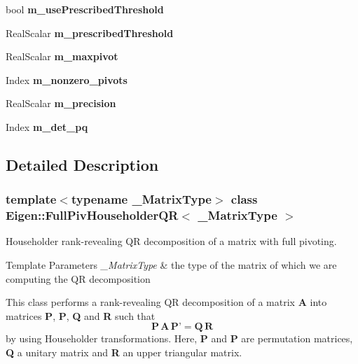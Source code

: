 \begin{DoxyCompactItemize}
bool {\bfseries m\+\_\+use\+Prescribed\+Threshold}
\item 
\mbox{\label{class_eigen_1_1_full_piv_householder_q_r_a9fc53f77872981ba211e5281d3bc5c1a}} 
Real\+Scalar {\bfseries m\+\_\+prescribed\+Threshold}
\item 
\mbox{\label{class_eigen_1_1_full_piv_householder_q_r_a44d0682e4e2f99fa5319304598f7724b}} 
Real\+Scalar {\bfseries m\+\_\+maxpivot}
\item 
\mbox{\label{class_eigen_1_1_full_piv_householder_q_r_ad5e3bdbf5f2da0a0e2e8a4482fbcdf1e}} 
Index {\bfseries m\+\_\+nonzero\+\_\+pivots}
\item 
\mbox{\label{class_eigen_1_1_full_piv_householder_q_r_a5e27bd23c1aa3208080354c357309d7e}} 
Real\+Scalar {\bfseries m\+\_\+precision}
\item 
\mbox{\label{class_eigen_1_1_full_piv_householder_q_r_a6fa460d74c719fed08d8c574ec13d41d}} 
Index {\bfseries m\+\_\+det\+\_\+pq}
\end{DoxyCompactItemize}


\subsection{Detailed Description}
\subsubsection*{template$<$typename \+\_\+\+Matrix\+Type$>$\newline
class Eigen\+::\+Full\+Piv\+Householder\+Q\+R$<$ \+\_\+\+Matrix\+Type $>$}

Householder rank-\/revealing QR decomposition of a matrix with full pivoting. 


\begin{DoxyTemplParams}{Template Parameters}
{\em \+\_\+\+Matrix\+Type} & the type of the matrix of which we are computing the QR decomposition\\
\hline
\end{DoxyTemplParams}
This class performs a rank-\/revealing QR decomposition of a matrix {\bfseries{A}} into matrices {\bfseries{P}}, {\bfseries{P\textquotesingle{}}}, {\bfseries{Q}} and {\bfseries{R}} such that \[ \mathbf{P} \, \mathbf{A} \, \mathbf{P}\text{'} = \mathbf{Q} \, \mathbf{R} \] by using Householder transformations. Here, {\bfseries{P}} and {\bfseries{P\textquotesingle{}}} are permutation matrices, {\bfseries{Q}} a unitary matrix and {\bfseries{R}} an upper triangular matrix.

